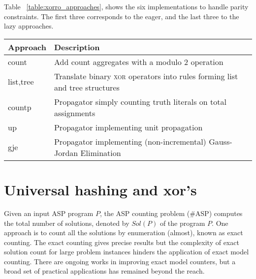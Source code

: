 \documentclass{article}
\def\asp{\textsf{\#ASP}\xspace}
\newcommand{\XOR}{\textsc{xor}} %
\newcommand{\fff}{$P$\xspace}
\newcommand{\sol}{$Sol(P)$\xspace}
\newcommand{\sysfont}{\textit}
\newcommand{\xorro}{\sysfont{xorro}}
\begin{document}
Table~ \ref{table:xorro_approaches}, shows the six implementations to handle parity constraints.
The first three corresponds to the eager, and the last three to the lazy approaches.



\begin{table*}[t]
	\caption{\xorro{} approaches to handle parity constraints}\label{table:xorro_approaches}
	\begin{tabular}{ l|l }
		Approach  & Description  \\
		\hline\hline
		count     & Add count aggregates with a modulo 2 operation  \\
		list,tree & Translate binary \XOR{} operators into rules forming list and tree structures \\
		countp    & Propagator simply counting truth literals on total assignments\\
		up        & Propagator implementing unit propagation\\
		gje       & Propagator implementing (non-incremental) Gauss-Jordan Elimination

	\end{tabular}
\end{table*}
%

\section{Universal hashing and xor's} \label{sec:hashing}
Given an input ASP program \fff, the ASP counting problem (\asp) computes the total number of solutions, denoted by \sol of the program \fff.
%
One approach is to count all the solutions by enumeration (almost), known as exact counting.
% 
The exact counting gives precise results but the complexity of exact solution count for large problem instances hinders the application of exact model counting.
%
There are ongoing works \cite{bibid} in improving exact model counters, but a broad set of practical applications has remained beyond the reach. 
%
\end{document}
